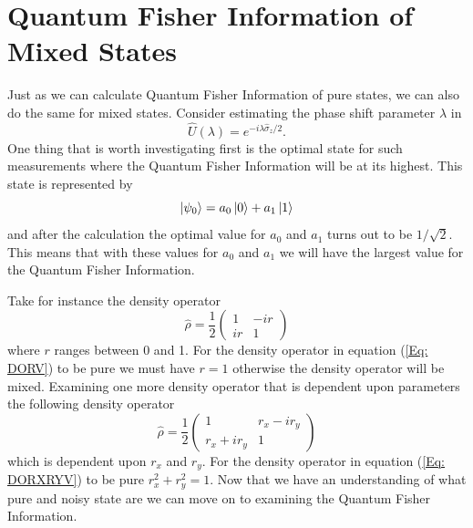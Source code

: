 \documentclass[twocolumn]{article}
\begin{document}
\section*{Quantum Fisher Information of Mixed States}
Just as we can calculate Quantum Fisher Information of pure states, we can also do the same for mixed states. Consider estimating the phase shift parameter $\lambda$ in
\begin{equation} \label{Eq: MSPS}
\hat{U}(\lambda)=e^{-i\lambda\hat{\sigma}_z/2}.
\end{equation}
One thing that is worth investigating first is the optimal state for such measurements where the Quantum Fisher Information will be at its highest. This state is represented by
\begin{equation} \label{Eq: QFIOS}
\ket{\psi_0}=a_0\ket{0}+a_1\ket{1}
\end{equation}
and after the calculation the optimal value for $a_0$ and $a_1$ turns out to be $1/\sqrt{2}$. This means that with these values for $a_0$ and $a_1$ we will have the largest value for the Quantum Fisher Information. 

Take for instance the density operator
\begin{equation} \label{Eq: DORV}
\hat{\rho}=\frac{1}{2}
\begin{pmatrix}
1 & -ir \\
ir & 1
\end{pmatrix}
\end{equation}
where $r$ ranges between 0 and 1. For the density operator in equation (\ref{Eq: DORV}) to be pure we must have $r=1$ otherwise the density operator will be mixed. Examining one more density operator that is dependent upon parameters the following density operator 
\begin{equation} \label{Eq: DORXRYV}
\hat{\rho}=\frac{1}{2}
\begin{pmatrix}
1 & r_x-ir_y \\
r_x+ir_y & 1
\end{pmatrix}
\end{equation}
which is dependent upon $r_x$ and $r_y$. For the density operator in equation (\ref{Eq: DORXRYV}) to be pure $r_x^2+r_y^2=1$. Now that we have an understanding of what pure and noisy state are we can move on to examining the Quantum Fisher Information.
\end{document}
